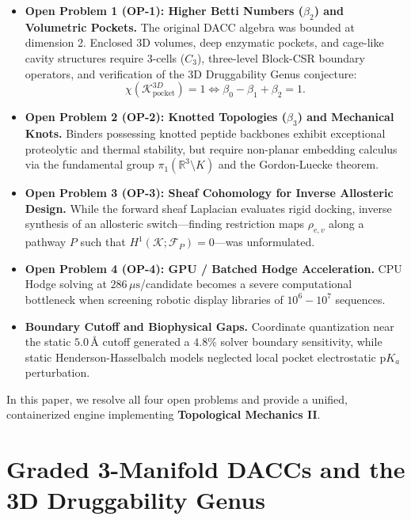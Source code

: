 \documentclass[11pt, a4paper]{article}
\theoremstyle{definition}
\theoremstyle{plain}
\theoremstyle{remark}
\begin{document}
\begin{itemize}[leftmargin=1.2cm]
    \item \textbf{Open Problem 1 (OP-1): Higher Betti Numbers ($\beta_2$) and Volumetric Pockets.} The original DACC algebra was bounded at dimension 2. Enclosed 3D volumes, deep enzymatic pockets, and cage-like cavity structures require 3-cells ($C_3$), three-level Block-CSR boundary operators, and verification of the 3D Druggability Genus conjecture:
    \begin{equation}
        \chi(\mathcal{K}_{\text{pocket}}^{3D}) = 1 \iff \beta_0 - \beta_1 + \beta_2 = 1.
    \end{equation}
    \item \textbf{Open Problem 2 (OP-2): Knotted Topologies ($\beta_3$) and Mechanical Knots.} Binders possessing knotted peptide backbones exhibit exceptional proteolytic and thermal stability, but require non-planar embedding calculus via the fundamental group $\pi_1(\mathbb{R}^3 \setminus K)$ and the Gordon-Luecke theorem.
    \item \textbf{Open Problem 3 (OP-3): Sheaf Cohomology for Inverse Allosteric Design.} While the forward sheaf Laplacian evaluates rigid docking, inverse synthesis of an allosteric switch—finding restriction maps $\rho_{e,v}$ along a pathway $P$ such that $H^1(\mathcal{K}; \mathcal{F}_P) = 0$—was unformulated.
    \item \textbf{Open Problem 4 (OP-4): GPU / Batched Hodge Acceleration.} CPU Hodge solving at $286\,\mu\text{s}$/candidate becomes a severe computational bottleneck when screening robotic display libraries of $10^6 - 10^7$ sequences.
    \item \textbf{Boundary Cutoff and Biophysical Gaps.} Coordinate quantization near the static $5.0\,\text{\AA}$ cutoff generated a $4.8\%$ solver boundary sensitivity, while static Henderson-Hasselbalch models neglected local pocket electrostatic $\mathrm{p}K_a$ perturbation.
\end{itemize}

In this paper, we resolve all four open problems and provide a unified, containerized engine implementing \textbf{Topological Mechanics II}.

\section{Graded 3-Manifold DACCs and the 3D Druggability Genus}
\label{sec:graded_dacc}
\end{document}
